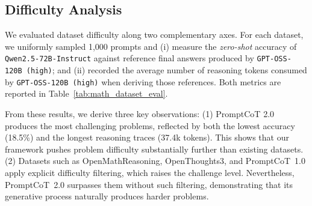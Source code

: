   
  \begin{table}[t]
  \centering
  \caption{Difficulty evaluation across datasets. 
  Lower accuracy of \texttt{Qwen2.5-72B-Instruct} indicates higher difficulty, while longer reasoning traces from \texttt{GPT-OSS-120B (high)} suggest that problems require deeper reasoning. 
  $^\dagger$: datasets that apply explicit difficulty filtering. }
  \label{tab:math_dataset_eval}
  \end{table}
  
  \subsection{Difficulty Analysis}
  We evaluated dataset difficulty along two complementary axes. For each dataset, we uniformly sampled 1,000 prompts and (i) measure the \emph{zero-shot} accuracy of \texttt{Qwen2.5-72B-Instruct} against reference final answers produced by \texttt{GPT-OSS-120B (high)}; and (ii) recorded the average number of reasoning tokens consumed by \texttt{GPT-OSS-120B (high)} when deriving those references. Both metrics are reported in Table~\ref{tab:math_dataset_eval}.
  
  From these results, we derive three key observations:
  (1) PromptCoT 2.0 produces the most challenging problems, reflected by both the lowest accuracy (18.5\%) and the longest reasoning traces (37.4k tokens). 
  This shows that our framework pushes problem difficulty substantially further than existing datasets. 
  (2) Datasets such as OpenMathReasoning, OpenThoughts3, and PromptCoT~1.0 apply explicit difficulty filtering, which raises the challenge level. 
  Nevertheless, PromptCoT~2.0 surpasses them without such filtering, demonstrating that its generative process naturally produces harder problems. 
  
